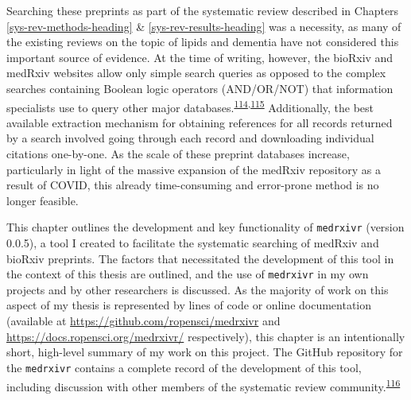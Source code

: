 \documentclass[a4paper, twoside]{templates/ociamthesis}
\begin{document}
Searching these preprints as part of the systematic review described in Chapters \ref{sys-rev-methods-heading} \& \ref{sys-rev-results-heading} was a necessity, as many of the existing reviews on the topic of lipids and dementia have not considered this important source of evidence. At the time of writing, however, the bioRxiv and medRxiv websites allow only simple search queries as opposed to the complex searches containing Boolean logic operators (AND/OR/NOT) that information specialists use to query other major databases.\textsuperscript{\protect\hyperlink{ref-bramer2018}{114},\protect\hyperlink{ref-gusenbauer2020}{115}} Additionally, the best available extraction mechanism for obtaining references for all records returned by a search involved going through each record and downloading individual citations one-by-one. As the scale of these preprint databases increase, particularly in light of the massive expansion of the medRxiv repository as a result of COVID, this already time-consuming and error-prone method is no longer feasible.

This chapter outlines the development and key functionality of \texttt{medrxivr} (version 0.0.5), a tool I created to facilitate the systematic searching of medRxiv and bioRxiv preprints. The factors that necessitated the development of this tool in the context of this thesis are outlined, and the use of \texttt{medrxivr} in my own projects and by other researchers is discussed. As the majority of work on this aspect of my thesis is represented by lines of code or online documentation (available at \url{https://github.com/ropensci/medrxivr} and \url{https://docs.ropensci.org/medrxivr/} respectively), this chapter is an intentionally short, high-level summary of my work on this project. The GitHub repository for the \texttt{medrxivr} contains a complete record of the development of this tool, including discussion with other members of the systematic review community.\textsuperscript{\protect\hyperlink{ref-zotero-15029}{116}}

~
\end{document}
